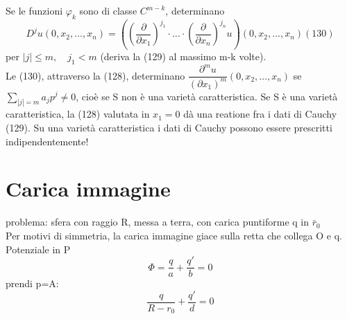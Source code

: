 \documentclass[a4paper,11pt]{report}
\begin{document}
Se le funzioni $\varphi_k$ sono di classe $C^{m-k}$, determinano 
\begin{equation}
D^j u(0,x_2,\dots,x_n)=\left(\left(\dfrac{\partial}{\partial x_1}\right)^{j_1}\cdot \dots \cdot \left(\dfrac{\partial}{\partial x_n}\right)^{j_n}u\right)(0,x_2,\dots,x_n) (130)
\end{equation}
per $|j|\leq m, \quad j_1<m$ (deriva la (129) al massimo m-k volte).\\
Le (130), attraverso la (128), determinano $\dfrac{\partial^m u}{(\partial x_1)^m} (0,x_2,\dots, x_n)$ se $\sum_{|j|=m} a_j p^j \neq 0$, cioè se S non è una varietà caratteristica. Se S è una varietà caratteristica, la (128) valutata in $x_1=0$ dà una reatione fra i dati di Cauchy (129). Su una varietà caratteristica i dati di Cauchy possono essere prescritti indipendentemente!
















\chapter{Carica immagine}
problema: sfera con raggio R, messa a terra, con carica puntiforme q in $\bar{r}_0$\\

Per motivi di simmetria, la carica immagine giace sulla retta che collega O e q.\\
Potenziale in P
\begin{equation}
\Phi = \dfrac{q}{a}+\dfrac{q'}{b} = 0
\end{equation}
prendi p=A:
\begin{equation}
\dfrac{q}{R-r_0} + \dfrac{q'}{d}=0
\end{equation}
\end{document}
